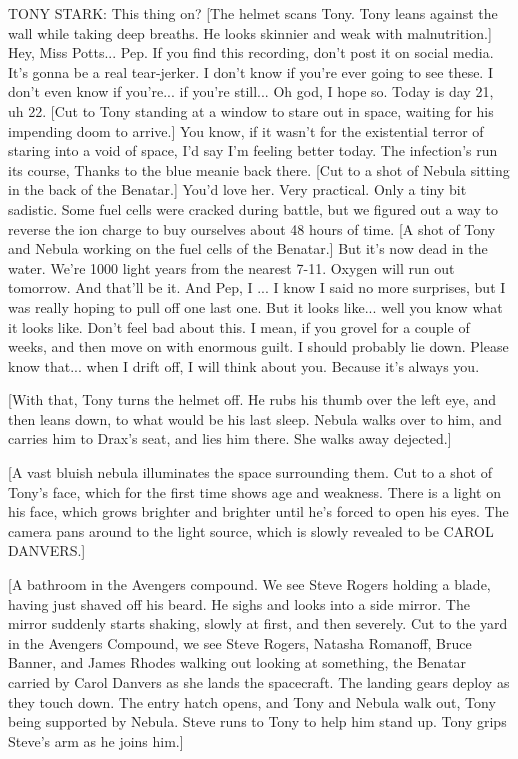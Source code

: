 TONY STARK: This thing on? [The helmet scans Tony. Tony leans against the wall while taking deep breaths. He looks skinnier and weak with malnutrition.] Hey, Miss Potts... Pep. If you find this recording, don't post it on social media. It's gonna be a real tear-jerker. I don't know if you're ever going to see these. I don't even know if you're... if you're still... Oh god, I hope so. Today is day 21, uh 22. [Cut to Tony standing at a window to stare out in space, waiting for his impending doom to arrive.] You know, if it wasn't for the existential terror of staring into a void of space, I'd say I'm feeling better today. The infection's run its course, Thanks to the blue meanie back there. [Cut to a shot of Nebula sitting in the back of the Benatar.] You'd love her. Very practical. Only a tiny bit sadistic. Some fuel cells were cracked during battle, but we figured out a way to reverse the ion charge to buy ourselves about 48 hours of time. [A shot of Tony and Nebula working on the fuel cells of the Benatar.] But it's now dead in the water. We're 1000 light years from the nearest 7-11. Oxygen will run out tomorrow. And that'll be it. And Pep, I ... I know I said no more surprises, but I was really hoping to pull off one last one. But it looks like... well you know what it looks like. Don't feel bad about this. I mean, if you grovel for a couple of weeks, and then move on with enormous guilt. I should probably lie down. Please know that... when I drift off, I will think about you. Because it's always you.

[With that, Tony turns the helmet off. He rubs his thumb over the left eye, and then leans down, to what would be his last sleep. Nebula walks over to him, and carries him to Drax's seat, and lies him there. She walks away dejected.]

[A vast bluish nebula illuminates the space surrounding them. Cut to a shot of Tony's face, which for the first time shows age and weakness. There is a light on his face, which grows brighter and brighter until he's forced to open his eyes. The camera pans around to the light source, which is slowly revealed to be CAROL DANVERS.]

[A bathroom in the Avengers compound. We see Steve Rogers holding a blade, having just shaved off his beard. He sighs and looks into a side mirror. The mirror suddenly starts shaking, slowly at first, and then severely. Cut to the yard in the Avengers Compound, we see Steve Rogers, Natasha Romanoff, Bruce Banner, and James Rhodes walking out looking at something, the Benatar carried by Carol Danvers as she lands the spacecraft. The landing gears deploy as they touch down. The entry hatch opens, and Tony and Nebula walk out, Tony being supported by Nebula. Steve runs to Tony to help him stand up. Tony grips Steve's arm as he joins him.]

